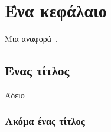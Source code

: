 \chapter{Ένα κεφάλαιο}
\label{ch:chapter1}

Μια αναφορά~\cite{google}.  

\section{Ένας τίτλος}

Άδειο

\subsection{Ακόμα ένας τίτλος}